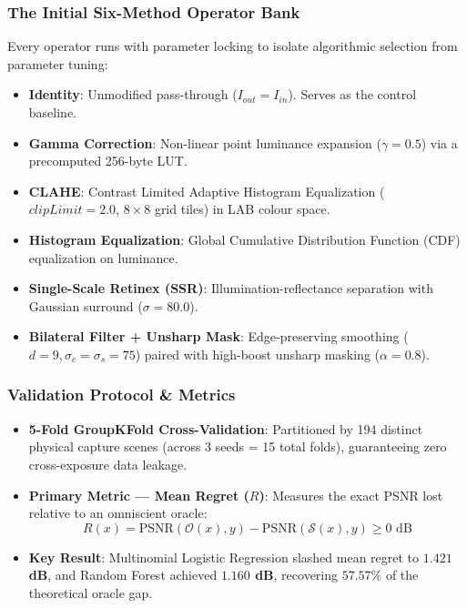 \documentclass[10pt,a4paper]{article}
\begin{document}
\subsubsection{The Initial Six-Method Operator Bank}
Every operator runs with parameter locking to isolate algorithmic selection from parameter tuning:
\begin{itemize}[leftmargin=*]
    \item \textbf{Identity}: Unmodified pass-through ($I_{out} = I_{in}$). Serves as the control baseline.
    \item \textbf{Gamma Correction}: Non-linear point luminance expansion ($\gamma = 0.5$) via a precomputed 256-byte LUT.
    \item \textbf{CLAHE}: Contrast Limited Adaptive Histogram Equalization ($clipLimit = 2.0$, $8 \times 8$ grid tiles) in LAB colour space.
    \item \textbf{Histogram Equalization}: Global Cumulative Distribution Function (CDF) equalization on luminance.
    \item \textbf{Single-Scale Retinex (SSR)}: Illumination-reflectance separation with Gaussian surround ($\sigma = 80.0$).
    \item \textbf{Bilateral Filter + Unsharp Mask}: Edge-preserving smoothing ($d=9, \sigma_c=\sigma_s=75$) paired with high-boost unsharp masking ($\alpha=0.8$).
\end{itemize}

\subsubsection{Validation Protocol \& Metrics}
\begin{itemize}[leftmargin=*]
    \item \textbf{5-Fold GroupKFold Cross-Validation}: Partitioned by 194 distinct physical capture scenes (across 3 seeds = 15 total folds), guaranteeing zero cross-exposure data leakage.
    \item \textbf{Primary Metric --- Mean Regret ($R$)}: Measures the exact PSNR lost relative to an omniscient oracle:
    \begin{equation}
    R(x) = \text{PSNR}(\mathcal{O}(x), y) - \text{PSNR}(\mathcal{S}(x), y) \ge 0\text{ dB}
    \end{equation}
    \item \textbf{Key Result}: Multinomial Logistic Regression slashed mean regret to \textbf{$1.421$ dB}, and Random Forest achieved \textbf{$1.160$ dB}, recovering \textbf{$57.57\%$} of the theoretical oracle gap.
\end{itemize}
\end{document}
